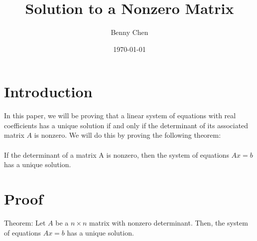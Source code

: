 \documentclass{article}
\title{Solution to a Nonzero Matrix}
\author{Benny Chen}
\date{\today}
\begin{document}
\maketitle

\section{Introduction}
In this paper, we will be proving that a linear system of equations with real coefficients has a unique solution if and only if the determinant of its associated matrix $A$ is nonzero. 
We will do this by proving the following theorem:
\\\\
If the determinant of a matrix A is nonzero, then the system of equations $Ax = b$ has a unique solution.

\section{Proof}

Theorem: Let $A$ be a $n \times n$ matrix with nonzero determinant. Then, the system of equations $Ax = b$ has a unique solution.
\end{document}
